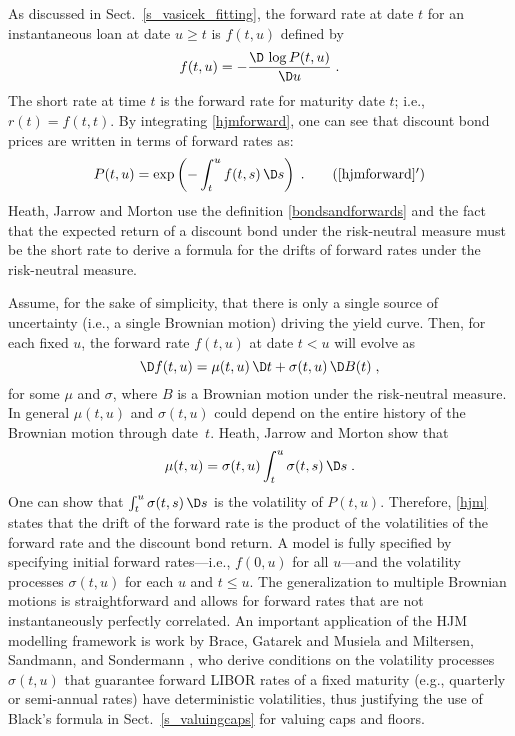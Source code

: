As discussed in Sect.~\ref{s_vasicek_fitting}, the forward rate at date $t$ for an instantaneous loan at date $u \geq t$ is $f(t,u)$ defined by 
\begin{equation}\label{hjmforward}
f(t,u)= -\frac{  \D \,\log P(t,u)}{\D u}\;.
\end{equation} 
The short rate at time $t$ is the forward rate for maturity
date $t$; i.e., $r(t)=f(t,t)$.
By integrating \eqref{hjmforward}, one can see that discount bond prices are written in terms of forward rates as: 
\begin{equation}\label{bondsandforwards}
P(t,u)= \exp\left( - \int _t^u f(t,s)\,\D s \right)\; .\tag{\ref{hjmforward}$'$}
\end{equation}
Heath, Jarrow and Morton use the definition \eqref{bondsandforwards} and the fact that the expected return of a discount bond under the risk-neutral measure must be the short rate to derive a formula for the drifts of forward rates under the risk-neutral measure.  

Assume, for the sake of simplicity, that there is only a
single source of uncertainty (i.e., a single Brownian motion)
driving
the yield curve.   
Then, for each fixed $u$, the forward rate $f(t,u)$  at date $t<u$ will evolve as
\begin{equation}\label{hjm100}
\D f(t,u)=\mu(t,u)\,\D t+\sigma(t,u)\,\D B(t)\;,
\end{equation}
for some  $\mu$ and $\sigma$, where $B$
is a Brownian motion under the risk-neutral measure.  In general $\mu(t,u)$ and $\sigma(t,u)$ could depend on the entire history of the Brownian motion through date~$t$.
Heath, Jarrow and Morton show that 
\begin{equation}\label{hjm}
\mu(t,u)=\sigma(t,u) \int_t^u \sigma(t,s)\,\D s\;.
\end{equation} 
One can show that
$\int_t^u \sigma(t,s)\,\D s$
is the volatility of $P(t,u)$.
Therefore, \eqref{hjm} states that the drift of the
forward rate is the product of the volatilities of the
forward rate and the discount bond return.  A model is fully specified by specifying initial forward rates---i.e., $f(0,u)$ for all $u$---and the volatility processes $\sigma(t,u)$ for each $u$ and $t \leq u$.  The generalization to multiple Brownian motions is straightforward and allows for forward rates that are not instantaneously perfectly correlated.  An important application of the HJM modelling framework is work by Brace, Gatarek and Musiela  \cite{BGM} and Miltersen, Sandmann, and Sondermann \cite{MSS}, who derive conditions on the volatility processes $\sigma(t,u)$ that guarantee forward LIBOR rates of a fixed maturity (e.g., quarterly or semi-annual rates) have deterministic volatilities, thus justifying the use of Black's formula in Sect.~\ref{s_valuingcaps} for valuing caps and floors.

